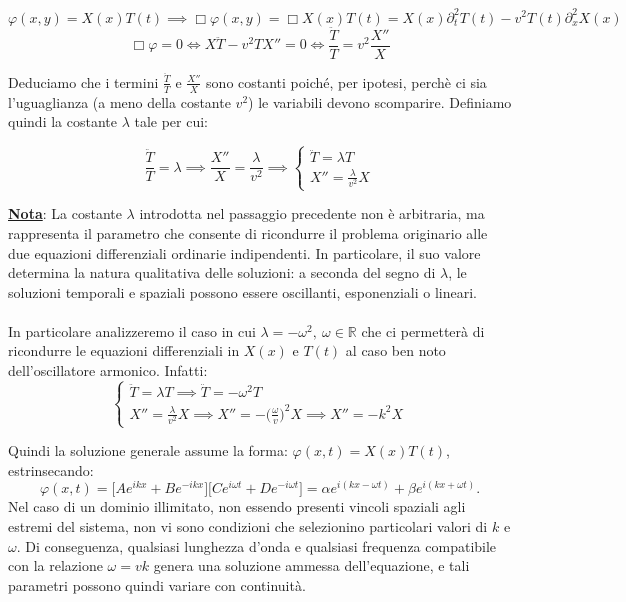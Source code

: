 \documentclass[a4paper,12pt]{report}
\begin{document}
\[\varphi(x,y)=X(x)T(t)\implies \Box\varphi (x,y)=\Box X(x)T(t)=X(x)\partial_t^2T(t)-v^2T(t)\partial_x^2X(x)\]
\[\Box\varphi=0\iff X\ddot{T}-v^2TX''=0\iff\frac{\ddot{T}}{T}=v^2\frac{X''}{X}\]

Deduciamo che i termini $\frac{\ddot{T}}{T}$ e $\frac{X''}{X}$ sono costanti poiché, per ipotesi, perchè ci sia l'uguaglianza (a meno della costante $v^2$) le variabili devono scomparire. Definiamo quindi la costante $\lambda$ tale per cui:

\[\frac{\ddot{T}}{T}=\lambda\implies \frac{X''}{X}=\frac{\lambda}{v^2}\implies \begin{cases}
    \ddot{T}=\lambda T 
    \\X''=\frac{\lambda}{v^2}X
\end{cases}\]

\underline{\textbf{Nota}}: La costante $\lambda$ introdotta nel passaggio precedente non è arbitraria, ma rappresenta il parametro che consente di ricondurre il problema originario alle due equazioni differenziali ordinarie indipendenti. In particolare, il suo valore determina la natura qualitativa delle soluzioni: a seconda del segno di $\lambda$, le soluzioni temporali e spaziali possono essere oscillanti, esponenziali o lineari.
\\
\\ In particolare analizzeremo il caso in cui $\lambda=-\omega^2, \ \omega\in \mathbb{R}$ che ci permetterà di ricondurre le equazioni differenziali in $X(x)$ e $T(t)$ al caso ben noto dell'oscillatore armonico. Infatti:
\[\displaystyle\begin{cases}
    \ddot{T}=\lambda T \implies \ddot{T}=-\omega^2T
    \\X''=\frac{\lambda}{v^2}X\implies X''=-\bigg(\frac{\omega}{v}\bigg)^2X\implies X''=-k^2X
\end{cases}\]

Quindi la soluzione generale assume la forma: $\varphi(x,t)=X(x)T(t)$, estrinsecando:
\[
\varphi(x,t)
=
\big[Ae^{ikx}+Be^{-ikx}\big]
\big[Ce^{i\omega t}+De^{-i\omega t}\big]
=
\alpha e^{i(kx-\omega t)}
+
\beta e^{i(kx+\omega t)}.
\]
Nel caso di un dominio illimitato, non essendo presenti vincoli spaziali agli estremi del sistema, non vi sono condizioni che selezionino particolari valori di $k$ e $\omega$. Di conseguenza, qualsiasi lunghezza d’onda e qualsiasi frequenza compatibile con la relazione $\omega=vk$ genera una soluzione ammessa dell’equazione, e tali parametri possono quindi variare con continuità.

\newpage
\end{document}
